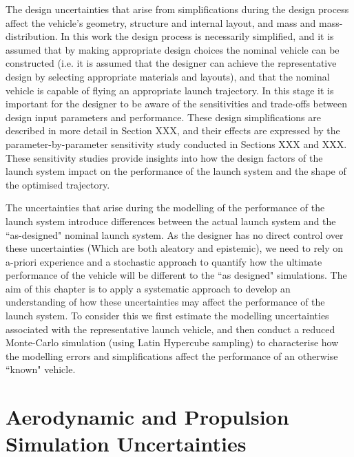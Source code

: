 The design uncertainties that arise from simplifications during the design process affect the vehicle's geometry, structure and internal layout, and mass and mass-distribution. In this work the design process is necessarily simplified, and it is assumed that by making appropriate design choices the nominal vehicle can be constructed (i.e. it is assumed that the designer can achieve the representative design by selecting appropriate materials and layouts), and that the nominal vehicle is capable of flying an appropriate launch trajectory. In this stage it is important for the designer to be aware of the sensitivities and trade-offs between design input parameters and performance. These design simplifications are described in more detail in Section XXX, and their effects are expressed by the parameter-by-parameter sensitivity study conducted in Sections XXX and XXX. These sensitivity studies provide insights into how the design factors of the launch system impact on the performance of the launch system and the shape of the optimised trajectory.

The uncertainties that arise during the modelling of the performance of the launch system introduce differences between the actual launch system and the ``as-designed" nominal launch system. 
As the designer has no direct control over these uncertainties (Which are both aleatory and epistemic), we need to rely on a-priori experience and a stochastic approach to quantify how the ultimate performance of the vehicle will be different to the ``as designed" simulations. The aim of this chapter is to apply a systematic approach to develop an understanding of how these uncertainties may affect the performance of the launch system. To consider this we first estimate the modelling uncertainties associated with the representative launch vehicle, and then conduct a reduced Monte-Carlo simulation (using Latin Hypercube sampling) to characterise how the modelling errors and simplifications affect the performance of an otherwise ``known" vehicle.




 







\section{Aerodynamic and Propulsion Simulation Uncertainties}


